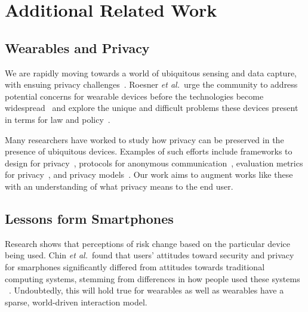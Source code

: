
\section{Additional Related Work}

\subsection{Wearables and Privacy}
We are rapidly moving towards a world of ubiquitous sensing and data capture, with ensuing privacy challenges~\cite{abowd2000charting,palen2003unpacking,camp2000internet}. Roesner {\it et al.}\ urge the community to address potential concerns for wearable devices before the technologies become widespread~\cite{roesner2014security} and explore the unique and difficult problems these devices present in terms for law and policy~\cite{roesner2014augmented}.

Many researchers have worked to study how privacy can be preserved in the presence of ubiquitous devices. Examples of such efforts include frameworks to design for privacy~\cite{bellotti1993design,camp2003designing,langheinrich2001privacy}, protocols for anonymous communication~\cite{cornelius2008anonysense}, evaluation metrics for privacy~\cite{scholtz2004toward}, and privacy models~\cite{hong2004privacy, jiang2002approximate}. Our work aims to augment works like these with an understanding of what privacy means to the end user. 

\subsection{Lessons form Smartphones}
Research shows that perceptions of risk change based on the particular device being used. Chin {\it et al.}\ found that users' attitudes toward security and privacy for smarphones significantly differed from attitudes towards traditional computing systems, stemming from differences in how people used these systems ~\cite{chin2012measuring}. Undoubtedly, this will hold true for wearables as well as wearables have a sparse, world-driven interaction model. 

